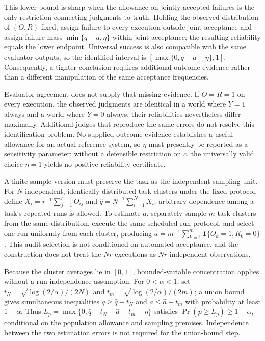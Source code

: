 \documentclass[11pt]{article}
\begin{document}
This lower bound is sharp when the allowance on jointly accepted failures is the only restriction connecting judgments to truth. Holding the observed distribution of $(O,R)$ fixed, assign failure to every execution outside joint acceptance and assign failure mass $\min\{q-a,\eta\}$ within joint acceptance; the resulting reliability equals the lower endpoint. Universal success is also compatible with the same evaluator outputs, so the identified interval is $[\max\{0,q-a-\eta\},1]$. Consequently, a tighter conclusion requires additional outcome evidence rather than a different manipulation of the same acceptance frequencies.

Evaluator agreement does not supply that missing evidence. If $O=R=1$ on every execution, the observed judgments are identical in a world where $Y=1$ always and a world where $Y=0$ always; their reliabilities nevertheless differ maximally. Additional judges that reproduce the same errors do not resolve this identification problem. No supplied outcome evidence establishes a useful allowance for an actual reference system, so $\eta$ must presently be reported as a sensitivity parameter; without a defensible restriction on $c$, the universally valid choice $\eta=1$ yields no positive reliability certificate.

A finite-sample version must preserve the task as the independent sampling unit. For $N$ independent, identically distributed task clusters under the fixed protocol, define $X_i=r^{-1}\sum_{j=1}^{r}O_{ij}$ and $\widehat q=N^{-1}\sum_{i=1}^{N}X_i$; arbitrary dependence among a task\textquoteright{}s repeated runs is allowed. To estimate $a$, separately sample $m$ task clusters from the same distribution, execute the same scheduled-run protocol, and select one run uniformly from each cluster, producing $\widehat a=m^{-1}\sum_{k=1}^{m}\mathbf{1}\{O_k=1,R_k=0\}$. This audit selection is not conditioned on automated acceptance, and the construction does not treat the $Nr$ executions as $Nr$ independent observations.

Because the cluster averages lie in $[0,1]$, bounded-variable concentration applies without a run-independence assumption. For $0<\alpha<1$, set $t_N=\sqrt{\log(2/\alpha)/(2N)}$ and $t_m=\sqrt{\log(2/\alpha)/(2m)}$; a union bound gives simultaneous inequalities $q\geq\widehat q-t_N$ and $a\leq\widehat a+t_m$ with probability at least $1-\alpha$. Thus $L_p=\max\{0,\widehat q-t_N-\widehat a-t_m-\eta\}$ satisfies $\Pr(p\geq L_p)\geq1-\alpha$, conditional on the population allowance and sampling premises. Independence between the two estimation errors is not required for the union-bound step.
\end{document}
